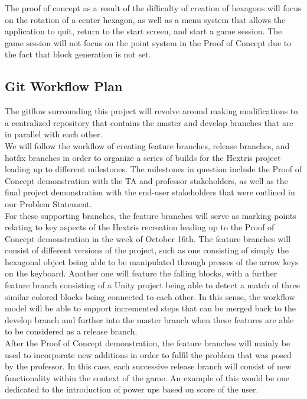 \documentclass[12pt]{article}
\begin{document}
The proof of concept as a result of the difficulty of creation of hexagons will focus on the rotation of a center hexagon, as well as a menu system that allows the application to quit, return to the start screen, and start a game session. The game session will not focus on the point system in the Proof of Concept due to the fact that block generation is not set. 

\subsection{Git Workflow Plan}
The gitflow surrounding this project will revolve around making modifications to a centralized repository that contains the master and develop branches that are in parallel with each other.\\

We will follow the workflow of creating feature branches, release branches, and hotfix branches in order to organize a series of builds for the Hextris project leading up to different milestones. The milestones in question include the Proof of Concept demonstration with the TA and professor stakeholders, as well as the final project demonstration with the end-user stakeholders that were outlined in our Problem Statement. \\

For these supporting branches, the feature branches will serve as marking points relating to key aspects of the Hextris recreation leading up to the Proof of Concept demonstration in the week of October 16th. The feature branches will consist of different versions of the project, such as one consisting of simply the hexagonal object being able to be manipulated through presses of the arrow keys on the keyboard. Another one will feature the falling blocks, with a further feature branch consisting of a Unity project being able to detect a match of three similar colored blocks being connected to each other. In this sense, the workflow model will be able to support incremented steps that can be merged back to the develop branch and further into the master branch when these features are able to be considered as a release branch. \\

After the Proof of Concept demonstration, the feature branches will mainly be used to incorporate new additions in order to fulfil the problem that was posed by the professor. In this case, each successive release branch will consist of new functionality within the context of the game. An example of this would be one dedicated to the introduction of power ups based on score of the user.\\
\end{document}
